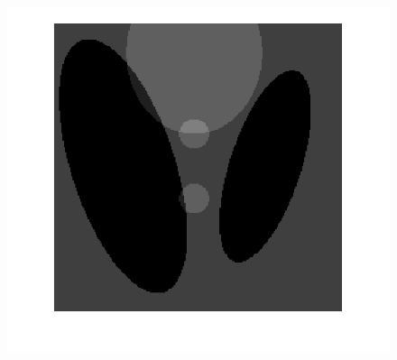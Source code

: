 \documentclass[hyperref]{ctexart}
\begin{document}
{\begin{figure}[htbp]
{				\includegraphics[scale=0.2]{1-1.png}
			}
			\quad
			\quad
			\subfigure[pic1.]{
}
\end{figure}}
\end{document}
